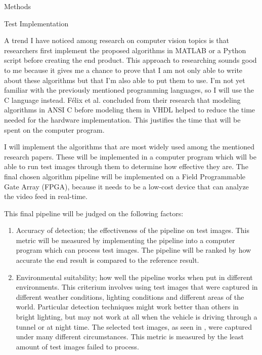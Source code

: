 \documentclass{matthijs}
\begin{document}
	\begin{hoofdstuk}{Methods}

		\begin{paragraaf}{Test Implementation}

			A trend I have noticed among research on computer vision topics is that researchers first implement the proposed algorithms in MATLAB or a Python script before creating the end product.
			This approach to researching sounds good to me because it gives me a chance to prove that I am not only able to write about these algorithms but that I'm also able to put them to use.
			I'm not yet familiar with the previously mentioned programming languages, so I will use the C language instead.
			F\'elix et al. \cite{felix2003low} concluded from their research that modeling algorithms in ANSI C before modeling them in VHDL helped to reduce the time needed for the hardware implementation.
			This justifies the time that will be spent on the computer program.

			I will implement the algorithms that are most widely used among the mentioned research papers.
			These will be implemented in a computer program which will be able to run test images through them to determine how effective they are.
			The final chosen algorithm pipeline will be implemented on a Field Programmable Gate Array (FPGA), because it needs to be a low-cost device that can analyze the video feed in real-time.

			\bigskip

			This final pipeline will be judged on the following factors:

			\begin{enumerate}

				\item	Accuracy of detection; the effectiveness of the pipeline on test images.
					This metric will be measured by implementing the pipeline into a computer program which can process test images.
					The pipeline will be ranked by how accurate the end result is compared to the reference result.

				\item	Environmental suitability; how well the pipeline works when put in different environments.
					This criterium involves using test images that were captured in different weather conditions, lighting conditions and different areas of the world.
					Particular detection techniques might work better than others in bright lighting, but may not work at all when the vehicle is driving through a tunnel or at night time.
					The selected test images, as seen in , were captured under many different circumstances.
					This metric is measured by the least amount of test images failed to process.


\end{enumerate}
\end{paragraaf}
\end{hoofdstuk}
\end{document}

